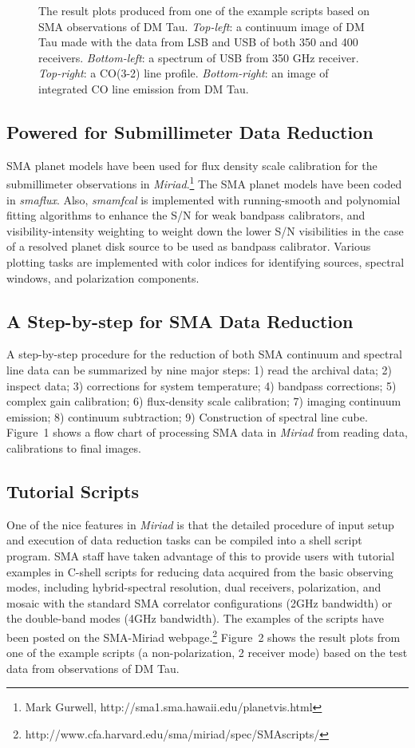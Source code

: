 \begin{figure}
\begin{minipage}{20pc}
\end{minipage}
\caption{The result plots produced from one of the example scripts 
based on SMA observations of DM Tau.
{\it Top-left}: a continuum image of DM Tau made with the data from LSB 
and USB of both 350 and 400 receivers.
{\it Bottom-left}: a spectrum of USB from 350 GHz receiver.
{\it Top-right}: a CO(3-2) line profile.
{\it Bottom-right}: an image of integrated CO line emission from DM Tau. }
\end{figure}


\subsection{Powered for Submillimeter Data Reduction}

SMA planet models have been used for flux density scale calibration 
for the submillimeter observations in {\it Miriad}.\footnote{Mark Gurwell, 
http://sma1.sma.hawaii.edu/planetvis.html}
The SMA planet models have been coded in {\it smaflux}.
Also,  {\it smamfcal} is implemented with 
running-smooth and polynomial fitting algorithms 
to enhance the S/N for weak bandpass calibrators, 
and visibility-intensity weighting to weight down 
the lower S/N visibilities in the case of a resolved 
planet disk source to be used as bandpass calibrator.
Various plotting tasks are implemented with color 
indices for identifying sources, spectral windows, and 
polarization components.

\subsection{A Step-by-step for SMA Data Reduction}
A step-by-step procedure for the reduction of both SMA continuum 
and spectral line data can be summarized by nine major steps: 
1) read the archival data; 
2) inspect data; 
3) corrections for system temperature; 
4) bandpass corrections; 
5) complex gain calibration; 
6) flux-density scale calibration; 
7) imaging continuum emission; 
8) continuum subtraction; 
9) Construction of spectral line cube. Figure~1 shows a flow chart
of processing SMA data in {\it Miriad} from reading data, calibrations
to final images.

\subsection{Tutorial Scripts }
One of the nice features in {\it Miriad} is that the detailed 
procedure of input setup and execution of data reduction tasks 
can be compiled into a shell script program. SMA staff have taken 
advantage of this to provide users with tutorial examples in C-shell 
scripts for reducing data acquired from the basic observing 
modes, including hybrid-spectral resolution, dual receivers, 
polarization, and mosaic with the standard SMA correlator configurations 
(2GHz bandwidth) or the double-band modes (4GHz bandwidth). 
The examples of the scripts have been posted on the SMA-Miriad 
webpage.\footnote{http://www.cfa.harvard.edu/sma/miriad/spec/SMAscripts/}
Figure~2 shows the result plots from one of the example scripts 
(a non-polarization, 2 receiver mode) based on the test data 
from observations of DM Tau.

